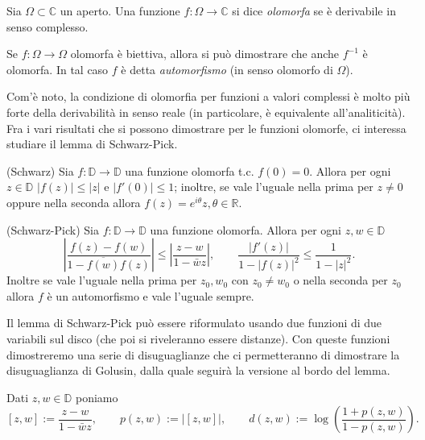 
\begin{defn}
  Sia $\Omega \subset \mathbb{C}$ un aperto. Una funzione $f:\Omega \longrightarrow \mathbb{C}$ si dice \textit{olomorfa} se è derivabile in senso complesso.
\end{defn}

\begin{oss}
  Se $f: \Omega \longrightarrow \Omega$ olomorfa è biettiva, allora si può dimostrare che anche $f^{-1}$ è olomorfa. In tal caso $f$ è detta \textit{automorfismo} (in senso olomorfo di $\Omega$).
\end{oss}

Com'è noto, la condizione di olomorfia per funzioni a valori complessi è molto più forte della derivabilità in senso reale (in particolare, è equivalente all'analiticità). Fra i vari risultati che si possono dimostrare per le funzioni olomorfe, ci interessa studiare il lemma di Schwarz-Pick.

\begin{lm}
  (Schwarz) Sia $f:\mathbb{D} \longrightarrow \mathbb{D}$ una funzione olomorfa t.c. $f(0)=0$. Allora per ogni $z \in \mathbb{D}$ $|f(z)| \le |z|$ e $|f'(0)| \le 1$; inoltre, se vale l'uguale nella prima per $z \not=0$ oppure nella seconda allora $f(z)=e^{i\theta}z, \theta \in \mathbb{R}$.
\end{lm}

\begin{lm}
  (Schwarz-Pick) Sia $f:\mathbb{D} \longrightarrow \mathbb{D}$ una funzione olomorfa.
  Allora per ogni $z, w \in \mathbb{D}$
  $$\left|\frac{f(z)-f(w)}{1-\overline{f(w)}f(z)}\right| \le \left|\frac{z-w}{1-\bar{w}z}\right|, \qquad \frac{|f'(z)|}{1-|f(z)|^2} \le \frac{1}{1-|z|^2}.$$
  Inoltre se vale l'uguale nella prima per $z_0, w_0$ con $z_0 \not=w_0$ o nella seconda per $z_0$ allora $f$ è un automorfismo e vale l'uguale sempre.
\end{lm}

Il lemma di Schwarz-Pick può essere riformulato usando due funzioni di due variabili sul disco (che poi si riveleranno essere distanze). Con queste funzioni dimostreremo una serie di disuguaglianze che ci permetteranno di dimostrare la disuguaglianza di Golusin, dalla quale seguirà la versione al bordo del lemma.

\begin{defn}
  Dati $z, w \in \mathbb{D}$ poniamo
  $$[z,w]:=\frac{z-w}{1-\bar{w}z}, \qquad p(z,w):=|[z,w]|, \qquad d(z,w):=\log\left(\frac{1+p(z,w)}{1-p(z,w)}\right).$$
\end{defn}

